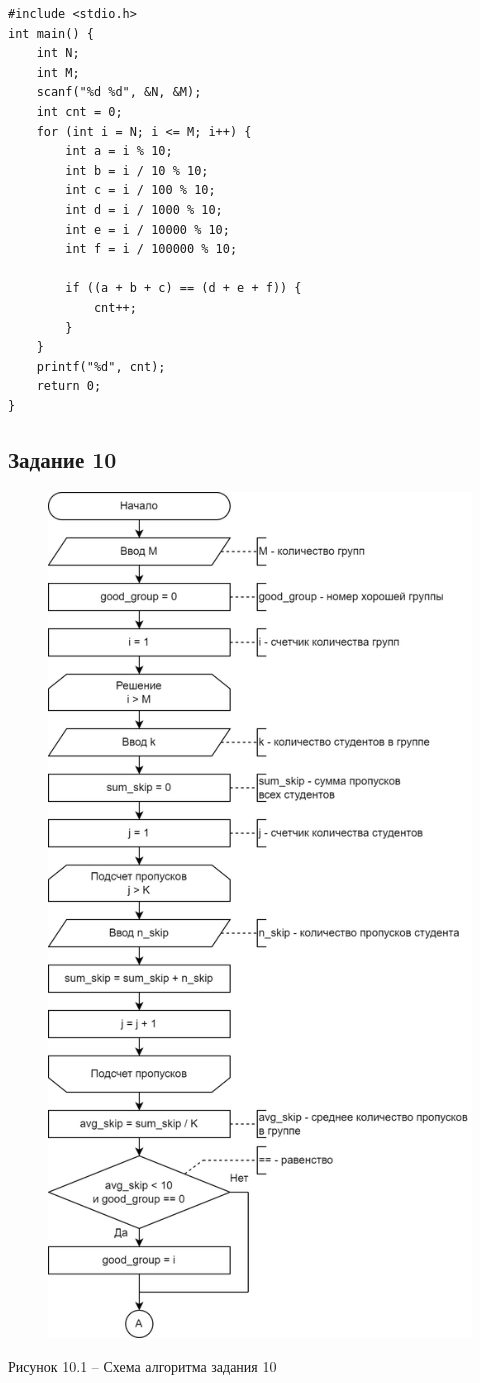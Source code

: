 \documentclass[a4paper,14pt]{extarticle}
\begin{document}
  \begin{lstlisting}
#include <stdio.h>
int main() {
    int N;
    int M;
    scanf("%d %d", &N, &M);
    int cnt = 0;
    for (int i = N; i <= M; i++) {
        int a = i % 10;
        int b = i / 10 % 10;
        int c = i / 100 % 10;
        int d = i / 1000 % 10;
        int e = i / 10000 % 10;
        int f = i / 100000 % 10;

        if ((a + b + c) == (d + e + f)) {
            cnt++;
        }
    }
    printf("%d", cnt);
    return 0;
}
  \end{lstlisting}

  \subsection*{Задание 10}
  \begin{figure}[h]
    \centering
    \includegraphics[width=0.6\linewidth]{schemes/t-10-1}
  \end{figure}
  \begin{center}
    Рисунок 10.1 – Схема алгоритма задания 10
  \end{center}
\end{document}
